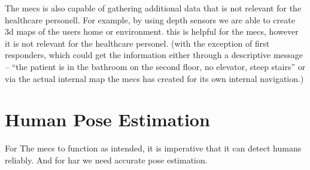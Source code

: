 The \gls{mecs} is also capable of gathering additional data that is not relevant for the healthcare personell. For example, by using depth sensors we are able to create 3d maps of the users home or environment. this is helpful for the \gls{mecs}, however it is not relevant for the healthcare personel. (with the exception of first responders, which could get the information either through a descriptive message -- ``the patient is in the bathroom on the second floor, no elevator, steep stairs'' or via the actual internal map the \gls{mecs} has created for its own internal navigation.)



\section{Human Pose Estimation}
For The \gls{mecs} to function as intended, it is imperative that it can detect humans reliably. And for \gls{har} we need accurate pose estimation. 
